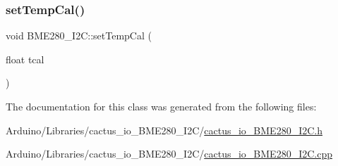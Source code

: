 \mbox{\label{class_b_m_e280___i2_c_a56de2784c69f2877300e26b7fc9f1f68}} 
\subsubsection{\texorpdfstring{set\+Temp\+Cal()}{setTempCal()}}
{\footnotesize\ttfamily void B\+M\+E280\+\_\+\+I2\+C\+::set\+Temp\+Cal (\begin{DoxyParamCaption}\item[{float}]{tcal }\end{DoxyParamCaption})}



The documentation for this class was generated from the following files\+:\begin{DoxyCompactItemize}
\item 
Arduino/\+Libraries/cactus\+\_\+io\+\_\+\+B\+M\+E280\+\_\+\+I2\+C/\hyperlink{cactus__io___b_m_e280___i2_c_8h}{cactus\+\_\+io\+\_\+\+B\+M\+E280\+\_\+\+I2\+C.\+h}\item 
Arduino/\+Libraries/cactus\+\_\+io\+\_\+\+B\+M\+E280\+\_\+\+I2\+C/\hyperlink{cactus__io___b_m_e280___i2_c_8cpp}{cactus\+\_\+io\+\_\+\+B\+M\+E280\+\_\+\+I2\+C.\+cpp}\end{DoxyCompactItemize}
